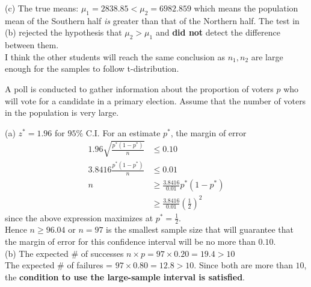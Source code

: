 \documentclass[boxes, qed]{homework}
\begin{document}
\begin{solution}
  (c) The true means: $\mu_1=2838.85 < \mu_2=6982.859$
  which means the population mean of the Southern half \textit{is}
  greater than that of the Northern half.
  The test in (b) rejected the hypothesis that $\mu_2>\mu_1$ and 
  \textbf{did not} detect the difference between them.\\
  I think the other students will reach the same conclusion
  as $n_1,n_2$ are large enough for the samples to follow
  t-distribution.
\end{solution}

\begin{problem}A poll is conducted to gather information about the proportion of voters $p$ who will vote
  for a candidate in a primary election. Assume that the number of voters in the population is very large.
\end{problem}
\begin{solution} (a) $z^*=1.96$ for $95\%$ C.I. 
  For an estimate $p^*$, the margin of error
  \begin{align*}
    1.96\sqrt{\frac{p^*(1-p^*)}{n}} &\le 0.10\\
    3.8416\frac{p^*(1-p^*)}{n} &\le 0.01\\
    n &\ge \frac{3.8416}{0.01} p^*(1-p^*)\\
    &\ge \frac{3.8416}{0.01}(\frac{1}{2})^2
  \end{align*}
  since the above expression maximizes at $p^*=\frac{1}{2}$.\\

  Hence $n\ge96.04$ or $n=97$ is the smallest sample size 
  that will guarantee that the margin of error for this 
  confidence interval will be no more than $0.10$.\\

  (b) The expected \# of successes $n \times p=97 \times 0.20 = 19.4 > 10$\\
  The expected \# of failures = $97 \times 0.80 = 12.8 > 10$. Since both are
  more than $10$, the \textbf{condition to use the large-sample interval is satisfied}.
\end{solution}
\end{document}
